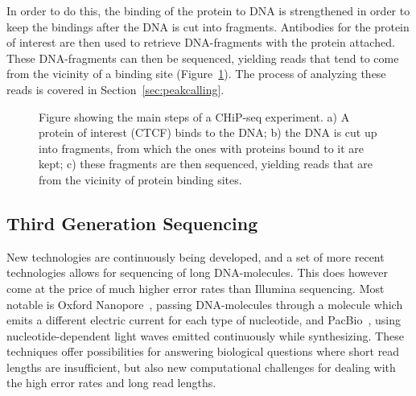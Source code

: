 In order to do this, the binding of the protein to DNA is strengthened in order to keep the bindings after the DNA is cut into fragments.
Antibodies for the protein of interest are then used to retrieve DNA-fragments with the protein attached.
These DNA-fragments can then be sequenced, yielding reads that tend to come from the vicinity of a binding site (Figure~\ref{fig:chipseq}). The process of analyzing these reads is covered in Section~\ref{sec:peakcalling}.
\begin{figure}

\caption{
  Figure showing the main steps of a CHiP-seq experiment. a) A protein of interest (CTCF) binds to the DNA; b) the DNA is cut up into fragments, from which the ones with proteins bound to it are kept; c) these fragments are then sequenced, yielding reads that are from the vicinity of protein binding sites.}
\label{fig:chipseq}
\end{figure}
\subsection{Third Generation Sequencing}
New technologies are continuously being developed, and a set of more recent technologies allows for sequencing of long DNA-molecules.
This does however come at the price of much higher error rates than Illumina sequencing.
Most notable is Oxford Nanopore~\cite{nanopore}, passing DNA-molecules through a molecule which emits a different electric current for each type of nucleotide, and PacBio~\cite{pacbio}, using  nucleotide-dependent light waves emitted continuously while synthesizing.
These techniques offer possibilities for answering biological questions where short read lengths are insufficient, but also new computational challenges for dealing with the high error rates and long read lengths.

